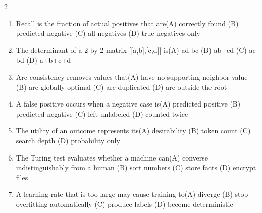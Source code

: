 \documentclass[a4paper]{article}
\begin{document}
\begin{multicols*}{2}
\begin{enumerate}
\item Recall is the fraction of actual positives that are\newline\hspace*{0.6em}(A) correctly found \quad (B) predicted negative \newline\hspace*{0.6em}(C) all negatives \quad (D) true negatives only
\item The determinant of a 2 by 2 matrix [[a,b],[c,d]] is\newline\hspace*{0.6em}(A) ad-bc \quad (B) ab+cd \newline\hspace*{0.6em}(C) ac-bd \quad (D) a+b+c+d
\item Arc consistency removes values that\newline\hspace*{0.6em}(A) have no supporting neighbor value \quad (B) are globally optimal \newline\hspace*{0.6em}(C) are duplicated \quad (D) are outside the root
\item A false positive occurs when a negative case is\newline\hspace*{0.6em}(A) predicted positive \quad (B) predicted negative \newline\hspace*{0.6em}(C) left unlabeled \quad (D) counted twice
\item The utility of an outcome represents its\newline\hspace*{0.6em}(A) desirability \quad (B) token count \newline\hspace*{0.6em}(C) search depth \quad (D) probability only
\item The Turing test evaluates whether a machine can\newline\hspace*{0.6em}(A) converse indistinguishably from a human \quad (B) sort numbers \newline\hspace*{0.6em}(C) store facts \quad (D) encrypt files
\item A learning rate that is too large may cause training to\newline\hspace*{0.6em}(A) diverge \quad (B) stop overfitting automatically \newline\hspace*{0.6em}(C) produce labels \quad (D) become deterministic

\end{enumerate}
\end{multicols*}
\end{document}
